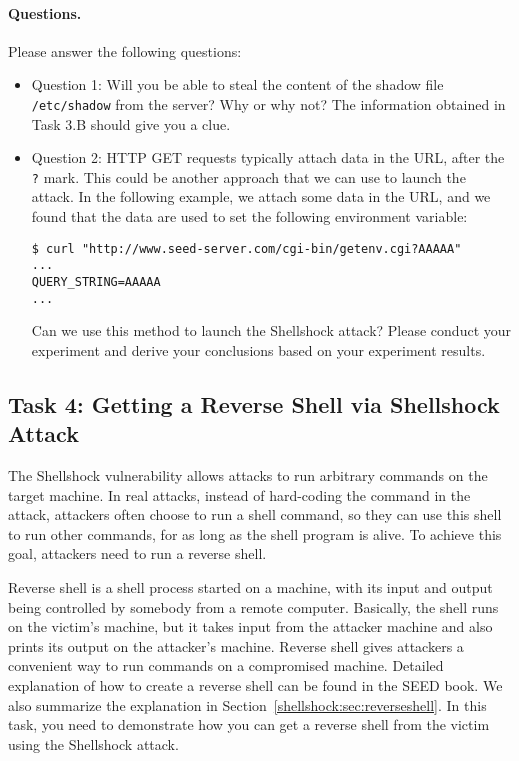 \paragraph{Questions.} Please answer the following questions:
\begin{itemize}
\item Question 1: Will you be able to steal the content of 
the shadow file \texttt{/etc/shadow} from the server? Why or why not?  
The information obtained in Task 3.B should give you a clue. 

\item Question 2: HTTP GET requests typically attach data in the URL, 
after the \texttt{?} mark. This could be another 
approach that we can use to launch the attack. In the following example,
we attach some data in the URL, and we found that the data are used to set
the following environment variable: 

\begin{lstlisting}
$ curl "http://www.seed-server.com/cgi-bin/getenv.cgi?AAAAA"
...
QUERY_STRING=AAAAA
...
\end{lstlisting}

Can we use this method to launch the Shellshock attack? Please conduct your 
experiment and derive your conclusions based on your experiment results. 
     
\end{itemize}

  


\subsection{Task 4: Getting a Reverse Shell via Shellshock Attack}

The Shellshock vulnerability allows attacks to run arbitrary commands on
the target machine. In real attacks, instead of hard-coding the command 
in the attack, attackers often choose to run a shell
command, so they can use this shell to run other commands,
for as long as the shell program is alive. 
To achieve this goal, attackers need to run a reverse shell.

Reverse shell is a shell process started on a machine, with its input and output being
controlled by somebody from a remote computer. Basically, the shell runs
on the victim's machine, but it takes input from the attacker machine and
also prints its output on the attacker's machine. Reverse shell
gives attackers a convenient way to run commands on a compromised machine. 
Detailed explanation of how to create a reverse shell can be found in 
the SEED book. We also summarize the explanation in
Section~\ref{shellshock:sec:reverseshell}.
In this task, you need to demonstrate 
how you can get a reverse shell from the victim using the Shellshock attack. 


